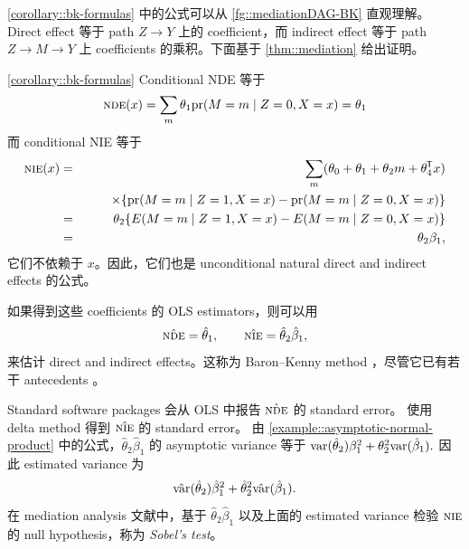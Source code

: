 \cref{corollary::bk-formulas} 中的公式可以从 \cref{fg::mediationDAG-BK} 直观理解。Direct effect 等于 path $Z\rightarrow Y$ 上的 coefficient，而 indirect effect 等于 path $Z\rightarrow M\rightarrow Y$ 上 coefficients 的乘积。下面基于 \cref{thm::mediation} 给出证明。


\begin{myproof}{}{\cref{corollary::bk-formulas}}
Conditional NDE 等于
$$
\textsc{nde}(x)  
= \sum_m  \theta_1  \textup{pr}(M=m \mid Z=0, X=x) = \theta_1
$$
而 conditional NIE 等于
\begin{eqnarray*}
\textsc{nie}(x) &=&  \sum_m  (\theta_0 + \theta_1  + \theta_2 m + \theta_4^{\mkern-1.5mu\mathsf{T}} x )\\
&&  \qquad  \times  \{ \textup{pr}(M=m \mid Z=1, X=x) -  \textup{pr}(M=m \mid Z=0, X=x) \} \\
&=& \theta_2 \{ E(M=m \mid Z=1, X=x) -  E(M=m \mid Z=0, X=x) \} \\
&=&  \theta_2 \beta_1 ,
\end{eqnarray*}
它们不依赖于 $x$。因此，它们也是 unconditional natural direct and indirect effects 的公式。
\end{myproof}


 
如果得到这些 coefficients 的 OLS estimators，则可以用
$$
\hat{\textsc{nde}} = \hat{\theta}_1,\qquad
\hat{\textsc{nie}} = \hat{\theta}_2 \hat{\beta}_1,
$$
来估计 direct and indirect effects。这称为 Baron--Kenny method \citep{Judd::1981, baron1986moderator}，尽管它已有若干 antecedents \citep[e.g.,][]{hyman1955survey, alwin1975decomposition, Judd::1981, sobel1982asymptotic}。


Standard software packages 会从 OLS 中报告 $\hat{\textsc{nde}}$ 的 standard error。\citet{sobel1982asymptotic, sobel1986some} 使用 delta method 得到 $\hat{\textsc{nie}}$ 的 standard error。
由 \cref{example::asymptotic-normal-product} 中的公式，$\hat{\theta}_2\hat{\beta}_1$ 的 asymptotic variance 等于
$
\textup{var}(\hat{\theta}_2)  \beta_1^2 + \theta_2^2 \textup{var}(\hat{\beta}_1) .
$
因此 estimated variance 为
$$
\hat{\textup{var}}(\hat{\theta}_2)  \hat{\beta}_1^2 + \hat{\theta}_2^2 \hat{\textup{var}}(\hat{\beta}_1) .
$$
在 mediation analysis 文献中，基于 $\hat{\theta}_2\hat{\beta}_1$ 以及上面的 estimated variance 检验 $\textsc{nie}$ 的 null hypothesis，称为 {\it Sobel's test}。


